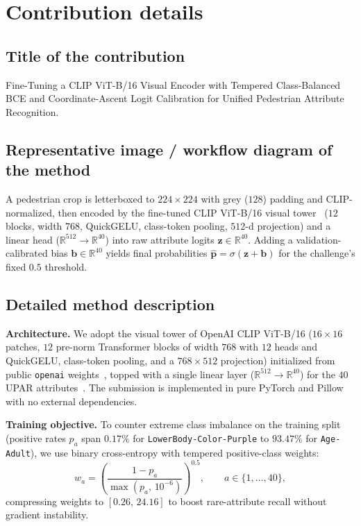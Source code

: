 \documentclass[a4paper, 10pt, conference]{ieeeconf}
\begin{document}

\section{Contribution details}
%

\subsection{Title of the contribution}
Fine-Tuning a CLIP ViT-B/16 Visual Encoder with Tempered Class-Balanced BCE and Coordinate-Ascent Logit Calibration for Unified Pedestrian Attribute Recognition.

\subsection{Representative image / workflow diagram of the method}
A pedestrian crop is letterboxed to $224\times224$ with grey ($128$) padding and CLIP-normalized, then encoded by the fine-tuned CLIP ViT-B/16 visual tower~\cite{radford2021clip} ($12$ blocks, width $768$, QuickGELU, class-token pooling, $512$-d projection) and a linear head ($\mathbb{R}^{512}\to\mathbb{R}^{40}$) into raw attribute logits $\mathbf{z}\in\mathbb{R}^{40}$. Adding a validation-calibrated bias $\mathbf{b}\in\mathbb{R}^{40}$ yields final probabilities $\hat{\mathbf{p}}=\sigma(\mathbf{z}+\mathbf{b})$ for the challenge's fixed $0.5$ threshold.

\subsection{Detailed method description}
\textbf{Architecture.} We adopt the visual tower of OpenAI CLIP ViT-B/16 ($16\times16$ patches, $12$ pre-norm Transformer blocks of width $768$ with $12$ heads and QuickGELU, class-token pooling, and a $768\times512$ projection) initialized from public \texttt{openai} weights~\cite{radford2021clip}, topped with a single linear layer ($\mathbb{R}^{512}\to\mathbb{R}^{40}$) for the $40$ UPAR attributes~\cite{Specker_2023_WACV,cormier2024upar}. The submission is implemented in pure PyTorch and Pillow with no external dependencies.

\textbf{Training objective.} To counter extreme class imbalance on the training split (positive rates $p_a$ span $0.17\%$ for \texttt{LowerBody-Color-Purple} to $93.47\%$ for \texttt{Age-Adult}), we use binary cross-entropy with tempered positive-class weights:
\begin{equation}
w_a = \left(\frac{1-p_a}{\max(p_a,\,10^{-6})}\right)^{0.5}, \qquad a \in \{1,\dots,40\},
\end{equation}
compressing weights to $[0.26,\,24.16]$ to boost rare-attribute recall without gradient instability.
\end{document}
